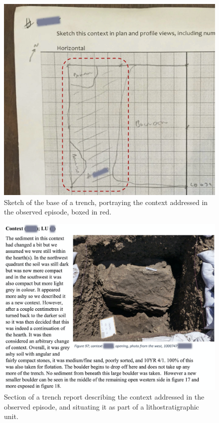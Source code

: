 \documentclass{article}
\begin{document}
\begin{figure}[hbt!]
  \centering
  \includegraphics[width=6in]{../../figures/context-sketch.png}
  \caption{Sketch of the base of a trench, portraying the context
  addressed in the observed episode, boxed in
  red.}\label{fig-context-sketch}
\end{figure}

\begin{figure}[hbt!]
  \centering
  \includegraphics[width=6in]{../../figures/context-report.png}
  \caption{Section of a trench report describing the context addressed in
  the observed episode, and situating it as part of a lithostratigraphic
  unit.}\label{fig-context-report}
\end{figure}
\end{document}
